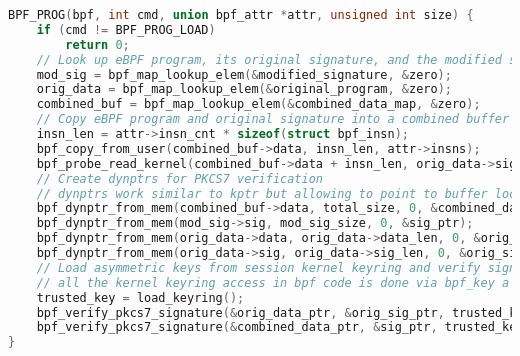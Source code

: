 \documentclass [11pt, proquest] {uwthesis}[2020/02/24]
\begin{document}
{\small 
\begin{lstlisting}[language=C, caption={Kernel BPF LSM Hook for PKCS7 Signature Verification}, label={lst:bpf-lsm}]
BPF_PROG(bpf, int cmd, union bpf_attr *attr, unsigned int size) {
    if (cmd != BPF_PROG_LOAD)
        return 0;
    // Look up eBPF program, its original signature, and the modified signature
    mod_sig = bpf_map_lookup_elem(&modified_signature, &zero);
    orig_data = bpf_map_lookup_elem(&original_program, &zero);
    combined_buf = bpf_map_lookup_elem(&combined_data_map, &zero);
    // Copy eBPF program and original signature into a combined buffer
    insn_len = attr->insn_cnt * sizeof(struct bpf_insn);
    bpf_copy_from_user(combined_buf->data, insn_len, attr->insns);
    bpf_probe_read_kernel(combined_buf->data + insn_len, orig_data->sig_len, orig_data->sig);
    // Create dynptrs for PKCS7 verification
    // dynptrs work similar to kptr but allowing to point to buffer location storing large amount of data as in case of signature for eBPF verifier requirements. 
    bpf_dynptr_from_mem(combined_buf->data, total_size, 0, &combined_data_ptr);
    bpf_dynptr_from_mem(mod_sig->sig, mod_sig_size, 0, &sig_ptr);
    bpf_dynptr_from_mem(orig_data->data, orig_data->data_len, 0, &orig_data_ptr);
    bpf_dynptr_from_mem(orig_data->sig, orig_data->sig_len, 0, &orig_sig_ptr);
    // Load asymmetric keys from session kernel keyring and verify signatures
    // all the kernel keyring access in bpf code is done via bpf_key a wrapper over kernel core key structure
    trusted_key = load_keyring();
    bpf_verify_pkcs7_signature(&orig_data_ptr, &orig_sig_ptr, trusted_key);
    bpf_verify_pkcs7_signature(&combined_data_ptr, &sig_ptr, trusted_key);
}
\end{lstlisting}
}
\end{document}
